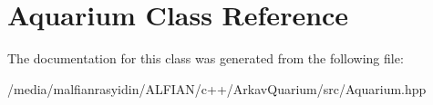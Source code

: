 \hypertarget{class_aquarium}{}\section{Aquarium Class Reference}
\label{class_aquarium}


The documentation for this class was generated from the following file\+:\begin{DoxyCompactItemize}
\item 
/media/malfianrasyidin/\+A\+L\+F\+I\+A\+N/c++/\+Arkav\+Quarium/src/Aquarium.\+hpp\end{DoxyCompactItemize}
